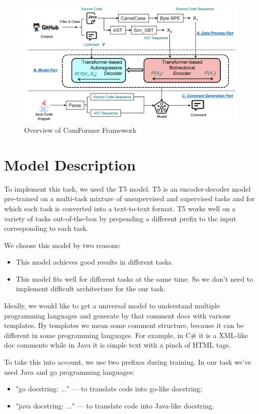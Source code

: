 \documentclass{article}
\begin{document}
\begin{figure}[!tbh]
    \centering
    \includegraphics[width=1.0\linewidth]{comformer.png}
    \caption{Overview of ComFormer Framework}
    \label{fig:comformer}
\end{figure}

\section{Model Description}

To implement this task, we used the T5 model. T5 is an encoder-decoder model pre-trained on a multi-task mixture of unsupervised and supervised tasks and for which each task is converted into a text-to-text format. T5 works well on a variety of tasks out-of-the-box by prepending a different prefix to the input corresponding to each task.

We choose this model by two reasons:
\begin{itemize}
    \item This model achieves good results in different tasks.
    \item This model fits well for different tasks at the same time. So we don't need to implement difficult architecture for the our task.
\end{itemize}

Ideally, we would like to get a universal model to understand multiple programming languages and generate by that comment docs with various templates. By templates we mean some comment structure, because it can be different in some programming languages. For example, in C\# it is a XML-like doc comments while in Java it is simple text with a pinch of HTML tags.

To take this into account, we use two prefixes during training. In our task we've used Java and go programming languages:
\begin{itemize}
    \item "go docstring: ..." --- to translate code into go-like docstring;
    \item "java docstring: ..." --- to translate code into Java-like docstring.
\end{itemize}
\end{document}
